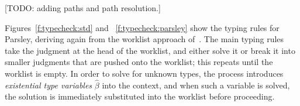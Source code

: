 \documentclass[letterpaper]{article}
\newcommand{\todo}[1]{{\color{red}[TODO: #1]}}
\newcommand{\etv}{{\widehat{\beta}}}  %
\begin{document}
\todo{adding paths and path resolution.}

Figures~\ref{f:typecheck:std} and ~\ref{f:typecheck:parsley} show the
typing rules for Parsley, deriving again from the worklist approach
of~\cite{zhao2018,zhao19:bidir}.  The main typing rules take the
judgment at the head of the worklist, and either solve it or break it
into smaller judgments that are pushed onto the worklist; this repeats
until the worklist is empty.  In order to solve for unknown types, the
process introduces {\em existential type variables} $\etv$ into the
context, and when such a variable is solved, the solution is
immediately substituted into the worklist before proceeding.

\newcommand\rstep[1]{~\longrightarrow}
\newcommand\typrule{\refstepcounter{ruleCounter}\rstep{\arabic{ruleCounter}}}
\end{document}
